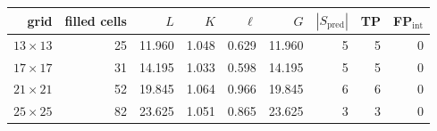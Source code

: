 \small
\begin{tabular}{r r r r r r r r r}
\toprule
grid & filled cells & $L$ & $K$ & $\ell$ & $G$ & $|S_{\mathrm{pred}}|$ & TP & FP$_{\mathrm{int}}$ \\
\midrule
$13 \times 13$ & 25 & 11.960 & 1.048 & 0.629 & 11.960 & 5  & 5  & 0 \\
$17 \times 17$ & 31 & 14.195 & 1.033 & 0.598 & 14.195 & 5  & 5  & 0 \\
$21 \times 21$ & 52 & 19.845 & 1.064 & 0.966 & 19.845 & 6  & 6  & 0 \\
$25 \times 25$ & 82 & 23.625 & 1.051 & 0.865 & 23.625 & 3  & 3  & 0 \\
\bottomrule
\end{tabular}
